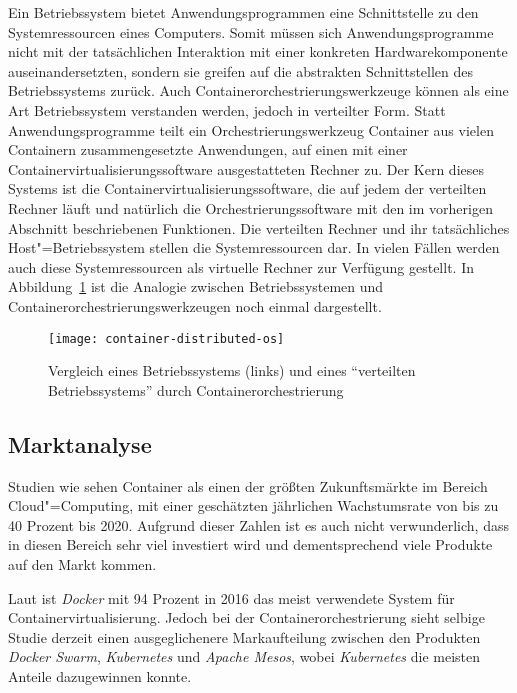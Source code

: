 Ein Betriebssystem bietet Anwendungsprogrammen eine Schnittstelle zu den Systemressourcen eines Computers. Somit müssen sich Anwendungsprogramme nicht mit der tatsächlichen Interaktion mit einer konkreten Hardwarekomponente auseinandersetzten, sondern sie greifen auf die abstrakten Schnittstellen des Betriebssystems zurück. Auch Containerorchestrierungswerkzeuge können als eine Art Betriebssystem verstanden werden, jedoch in verteilter Form. Statt Anwendungsprogramme teilt ein Orchestrierungswerkzeug Container \bzw aus vielen Containern zusammengesetzte Anwendungen, auf einen mit einer Containervirtualisierungssoftware ausgestatteten Rechner zu. Der Kern dieses Systems ist die Containervirtualisierungssoftware, die auf jedem der verteilten Rechner läuft und natürlich die Orchestrierungssoftware mit den im vorherigen Abschnitt beschriebenen Funktionen. Die verteilten Rechner und ihr tatsächliches Host"=Betriebssystem stellen die Systemressourcen dar. In vielen Fällen werden auch diese Systemressourcen als virtuelle Rechner zur Verfügung gestellt. In Abbildung~\ref{fig:container-distributed-os} ist die Analogie zwischen Betriebssystemen und Containerorchestrierungswerkzeugen noch einmal dargestellt.

\begin{figure}[!hbt]%
\centering
\texttt{[image: container-distributed-os]}%
\caption{Vergleich eines Betriebssystems (links) und eines "`verteilten Betriebssystems"' durch Containerorchestrierung}%
\label{fig:container-distributed-os}%
\end{figure}

\subsection{Marktanalyse}

Studien wie \cite{ContainerMarketGrowth} sehen Container als einen der größten Zukunftsmärkte im Bereich Cloud"=Computing, mit einer geschätzten jährlichen Wachstumsrate von bis zu 40 Prozent bis 2020. Aufgrund dieser Zahlen ist es auch nicht verwunderlich, dass in diesen Bereich sehr viel investiert wird und dementsprechend viele Produkte auf den Markt kommen. 

Laut \cite{ContainerMarketReport} ist \textit{Docker} mit 94 Prozent in 2016 das meist verwendete System für Containervirtualisierung. Jedoch bei der Containerorchestrierung sieht selbige Studie derzeit einen ausgeglichenere Markaufteilung zwischen den Produkten \textit{Docker Swarm}, \textit{Kubernetes} und \textit{Apache Mesos}, wobei \textit{Kubernetes} die meisten Anteile dazugewinnen konnte.

